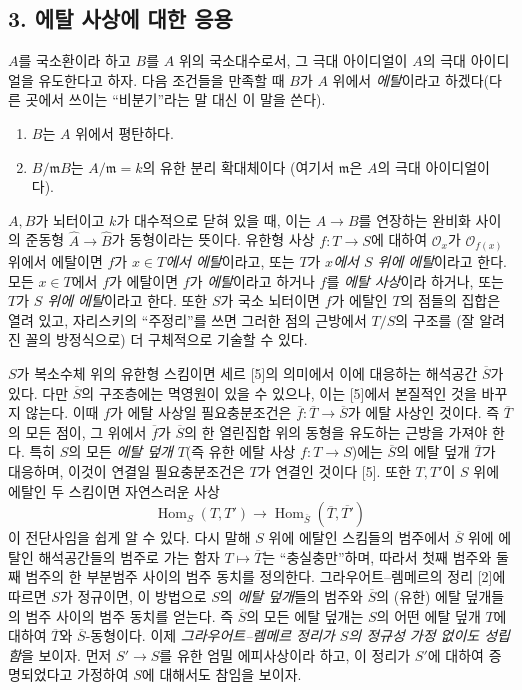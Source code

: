 \documentclass[11pt,twoside,openany]{book}
\numberwithin{equation}{section}
\newcommand{\sourceunit}{front}
\newcommand{\src}[1]{%
  \phantomsection\hypertarget{src:\sourceunit:#1}{}%
  \marginpar{\raggedleft\footnotesize\sffamily #1}%
}
\theoremstyle{plain}
\theoremstyle{definition}
\theoremstyle{remark}
\begin{document}
\src{308}
\subsection*{3. 에탈 사상에 대한 응용}

$A$를 국소환이라 하고 $B$를 $A$ 위의 국소대수로서, 그 극대 아이디얼이
$A$의 극대 아이디얼을 유도한다고 하자. 다음 조건들을 만족할 때 $B$가
$A$ 위에서 \emph{에탈}이라고 하겠다(다른 곳에서 쓰이는 ``비분기''라는
말 대신 이 말을 쓴다).
\begin{enumerate}
\item[(i)] $B$는 $A$ 위에서 평탄하다.
\item[(ii)] $B/\mathfrak mB$는 $A/\mathfrak m=k$의 유한 분리 확대체이다
  (여기서 $\mathfrak m$은 $A$의 극대 아이디얼이다).
\end{enumerate}
$A,B$가 뇌터이고 $k$가 대수적으로 닫혀 있을 때, 이는
$A\longrightarrow B$를 연장하는 완비화 사이의 준동형
$\widehat A\longrightarrow\widehat B$가 동형이라는 뜻이다. 유한형 사상
$f:T\longrightarrow S$에 대하여 $\mathcal O_x$가
$\mathcal O_{f(x)}$ 위에서 에탈이면 $f$가 \emph{$x\in T$에서 에탈}이라고,
또는 $T$가 \emph{$x$에서 $S$ 위에 에탈}이라고 한다. 모든 $x\in T$에서
$f$가 에탈이면 $f$가 \emph{에탈}이라고 하거나 $f$를 \emph{에탈 사상}이라
하거나, 또는 $T$가 \emph{$S$ 위에 에탈}이라고 한다. 또한 $S$가 국소
뇌터이면 $f$가 에탈인 $T$의 점들의 집합은 열려 있고, 자리스키의
``주정리''를 쓰면 그러한 점의 근방에서 $T/S$의 구조를 (잘 알려진 꼴의
방정식으로) 더 구체적으로 기술할 수 있다.

$S$가 복소수체 위의 유한형 스킴이면 세르 [5]의 의미에서 이에 대응하는
해석공간 $\overline S$가 있다. 다만 $\overline S$의 구조층에는 멱영원이
있을 수 있으나, 이는 [5]에서 본질적인 것을 바꾸지 않는다. 이때 $f$가
에탈 사상일 필요충분조건은
$\overline f:\overline T\longrightarrow\overline S$가 에탈 사상인 것이다.
즉 $\overline T$의 모든 점이, 그 위에서 $\overline f$가 $\overline S$의 한
열린집합 위의 동형을 유도하는 근방을 가져야 한다. 특히 $S$의 모든
\emph{에탈 덮개} $T$(즉 유한 에탈 사상 $f:T\longrightarrow S$)에는
$\overline S$의 에탈 덮개 $\overline T$가 대응하며, 이것이 연결일
필요충분조건은 $T$가 연결인 것이다 [5]. 또한 $T,T'$이 $S$ 위에 에탈인
두 스킴이면 자연스러운 사상
\[
  \operatorname{Hom}_S(T,T')\longrightarrow
  \operatorname{Hom}_{\overline S}(\overline T,\overline{T'})
\]
이 전단사임을 쉽게 알 수 있다. 다시 말해 $S$ 위에 에탈인 스킴들의
범주에서 $\overline S$ 위에 에탈인 해석공간들의 범주로 가는 함자
$T\longmapsto\overline T$는 ``충실충만''하며, 따라서 첫째 범주와 둘째
범주의 한 부분범주 사이의 범주 동치를 정의한다. 그라우어트--렘메르의
정리 [2]에 따르면 $S$가 정규이면, 이 방법으로 $S$의 \emph{에탈 덮개}들의
범주와 $\overline S$의 (유한) 에탈 덮개들의 범주 사이의 범주 동치를
얻는다. 즉 $\overline S$의 모든 에탈 덮개는 $S$의 어떤 에탈 덮개 $T$에
대하여 $\overline T$와 $\overline S$-동형이다. 이제 \emph{그라우어트--렘메르
정리가 $S$의 정규성 가정 없이도 성립함}을 보이자. 먼저
$S'\longrightarrow S$를 유한 엄밀 에피사상이라 하고, 이 정리가 $S'$에
대하여 증명되었다고 가정하여 $S$에 대해서도 참임을 보이자.
\end{document}
